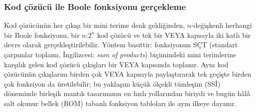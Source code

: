 \subsubsection{Kod çözücü ile Boole fonksiyonu gerçekleme}
Kod çözücünün her çıkışı bir mini terime denk geldiğinden, $n$-değişkenli herhangi bir Boole fonksiyonu, bir $n$:$2^n$ kod çözücü ve tek bir VEYA kapısıyla iki katlı bir devre olarak gerçekleştirilebilir. Yöntem basittir: fonksiyonun SÇT (standart çarpımlar toplamı, İngilizcesi: \emph{sum of products}) biçimindeki mini terimlerine karşılık gelen kod çözücü çıkışları bir VEYA kapısında toplanır. Aynı kod çözücünün çıkışlarını birden çok VEYA kapısıyla paylaştırarak tek geçişte birden çok fonksiyon da üretilebilir; bu yaklaşım küçük ölçekli tümleşim (SSİ) döneminde birleşik mantık tasarımının en hızlı yollarından biriydi ve bugün hâlâ salt okunur bellek (ROM) tabanlı fonksiyon tabloları ile aynı ilkeye dayanır.

